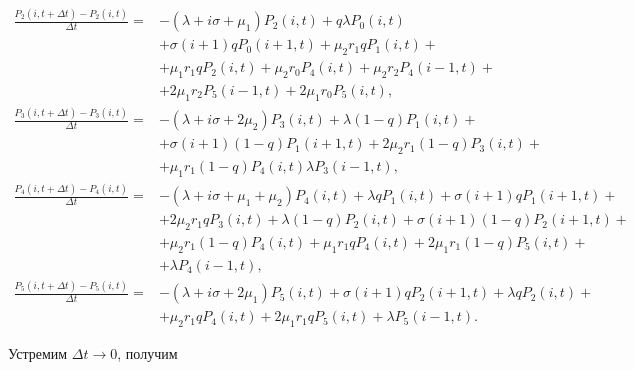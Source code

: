 \begin{adjustwidth}{0pt}{0pt}
	\begin{align*}
		\frac{P_{2}(i,t+\Delta t) - P_{2}(i, t)}{\Delta t}=&-(\lambda+i\sigma+\mu_{1})P_{2}(i,t)+q\lambda P_{0}(i,t)\\
		&+\sigma(i+1)qP_{0}(i+1,t)+\mu_{2}r_{1}qP_{1}(i,t)+\\
		&+\mu_{1}r_{1}qP_{2}(i,t)+\mu_{2}r_{0}P_{4}(i,t)+\mu_{2}r_{2}P_{4}(i-1,t)+\\
		&+2\mu_{1}r_{2}P_{5}(i-1,t)+2\mu_{1}r_{0}P_{5}(i,t),\\
		\frac{P_{3}(i,t+\Delta t) - P_{3}(i, t)}{\Delta t}=&-(\lambda+i\sigma+2\mu_{2})P_{3}(i,t)+\lambda(1-q)P_{1}(i,t)+\\
		&+\sigma(i+1)(1-q)P_{1}(i+1,t)+2\mu_{2}r_{1}(1-q)P_{3}(i,t)+\\
		&+\mu_{1}r_{1}(1-q)P_{4}(i,t)\lambda P_{3}(i-1,t),\\
		\frac{P_{4}(i,t+\Delta t) - P_{4}(i, t)}{\Delta t}=&-(\lambda+i\sigma+\mu_{1}+\mu_{2})P_{4}(i,t)+\lambda qP_{1}(i,t)+\sigma(i+1)qP_{1}(i+1,t)+\\
		&+2\mu_{2}r_{1}qP_{3}(i,t)+\lambda(1-q)P_{2}(i,t)+\sigma(i+1)(1-q)P_{2}(i+1,t)+\\
		&+\mu_{2}r_{1}(1-q)P_{4}(i,t)+\mu_{1}r_{1}qP_{4}(i,t)+2\mu_{1}r_{1}(1-q)P_{5}(i,t)+\\
		&+\lambda P_{4}(i-1,t),\\
		\frac{P_{5}(i,t+\Delta t) - P_{5}(i, t)}{\Delta t}=&-(\lambda+i\sigma+2\mu_{1})P_{5}(i,t)+\sigma(i+1)qP_{2}(i+1,t)+\lambda qP_{2}(i,t)+\\
		&+\mu_{2}r_{1}qP_{4}(i,t)+2\mu_{1}r_{1}qP_{5}(i,t)+\lambda P_{5}(i-1,t).
	\end{align*}
\end{adjustwidth}
Устремим $\Delta t \rightarrow 0$, получим 
